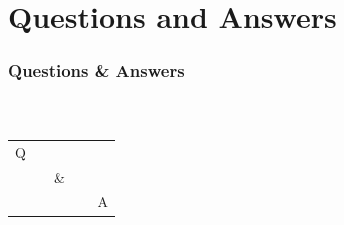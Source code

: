 \documentclass{beamer}
\begin{document}
\section{Questions and Answers}

\begin{frame}
	\frametitle<presentation>{Questions \& Answers}
	\framesubtitle{~}
	\begin{center}
		\fontsize{64}{64}\selectfont
		\begin{tabular}{ccc}
			Q &&\\
			& ~~\& & \\
			&&~~ A
		\end{tabular}
	\end{center}
\end{frame}

% 
% 
% 
% 
% 
% 
% 
\end{document}
